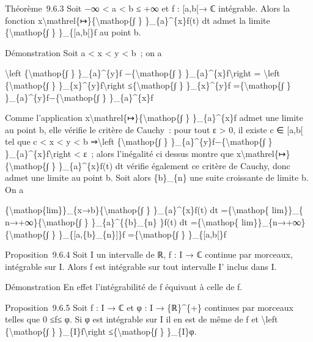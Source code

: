 \documentclass[]{article}
\begin{document}
Théorème~9.6.3 Soit −∞ \textless{} a \textless{} b ≤ +∞ et f :
{[}a,b{[}→ ℂ intégrable. Alors la fonction
x\textbackslash{}mathrel\{↦\}\{\textbackslash{}mathop\{∫ \}
\}\_\{a\}\^{}\{x\}f(t) dt admet la limite \{\textbackslash{}mathop\{∫ \}
\}\_\{{[}a,b{[}\}f au point b.

Démonstration Soit a \textless{} x \textless{} y \textless{} b~; on a

\textbackslash{}left \textbar{}\{\textbackslash{}mathop\{∫ \}
\}\_\{a\}\^{}\{y\}f −\{\textbackslash{}mathop\{∫ \}
\}\_\{a\}\^{}\{x\}f\textbackslash{}right \textbar{} =
\textbackslash{}left \textbar{}\{\textbackslash{}mathop\{∫ \}
\}\_\{x\}\^{}\{y\}f\textbackslash{}right
\textbar{}≤\{\textbackslash{}mathop\{∫ \}
\}\_\{x\}\^{}\{y\}\textbar{}f\textbar{} =\{\textbackslash{}mathop\{∫ \}
\}\_\{a\}\^{}\{y\}\textbar{}f\textbar{}−\{\textbackslash{}mathop\{∫ \}
\}\_\{a\}\^{}\{x\}\textbar{}f\textbar{}

Comme l'application
x\textbackslash{}mathrel\{↦\}\{\textbackslash{}mathop\{∫ \}
\}\_\{a\}\^{}\{x\}\textbar{}f\textbar{} admet une limite au point b,
elle vérifie le critère de Cauchy~: pour tout ε \textgreater{} 0, il
existe c ∈ {[}a,b{[} tel que c \textless{} x \textless{} y \textless{} b
⇒\textbackslash{}left \textbar{}\{\textbackslash{}mathop\{∫ \}
\}\_\{a\}\^{}\{y\}\textbar{}f\textbar{}−\{\textbackslash{}mathop\{∫ \}
\}\_\{a\}\^{}\{x\}\textbar{}f\textbar{}\textbackslash{}right \textbar{}
\textless{} ε~; alors l'inégalité ci dessus montre que
x\textbackslash{}mathrel\{↦\}\{\textbackslash{}mathop\{∫ \}
\}\_\{a\}\^{}\{x\}f(t) dt vérifie également ce critère de Cauchy, donc
admet une limite au point b. Soit alors \{b\}\_\{n\} une suite
croissante de limite b. On a

\{\textbackslash{}mathop\{lim\}\}\_\{x→b\}\{\textbackslash{}mathop\{∫ \}
\}\_\{a\}\^{}\{x\}f(t) dt =\{\textbackslash{}mathop\{ lim\}\}\_\{
n→+∞\}\{\textbackslash{}mathop\{∫ \} \}\_\{a\}\^{}\{\{b\}\_\{n\} \}f(t)
dt =\{\textbackslash{}mathop\{
lim\}\}\_\{n→+∞\}\{\textbackslash{}mathop\{∫ \}
\}\_\{{[}a,\{b\}\_\{n\}{]}\}f =\{\textbackslash{}mathop\{∫ \}
\}\_\{{[}a,b{[}\}f

Proposition~9.6.4 Soit I un intervalle de ℝ, f : I → ℂ continue par
morceaux, intégrable sur I. Alors f est intégrable sur tout intervalle
I' inclus dans I.

Démonstration En effet l'intégrabilité de f équivaut à celle de
\textbar{}f\textbar{}.

Proposition~9.6.5 Soit f : I → ℂ et φ : I → \{ℝ\}\^{}\{+\} continues par
morceaux telles que 0 ≤\textbar{}f\textbar{}≤ φ. Si φ est intégrable sur
I il en est de même de f et \textbackslash{}left
\textbar{}\{\textbackslash{}mathop\{∫ \} \}\_\{I\}f\textbackslash{}right
\textbar{}≤\{\textbackslash{}mathop\{∫ \} \}\_\{I\}φ.
\end{document}
